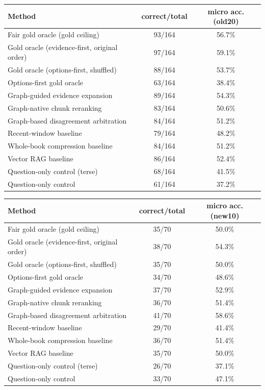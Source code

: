 \begin{tabular}{lcc}
\toprule
Method & correct/total & micro acc. (old20) \\
\midrule
Fair gold oracle (gold ceiling) & 93/164 & 56.7\% \\
Gold oracle (evidence-first, original order) & 97/164 & 59.1\% \\
Gold oracle (options-first, shuffled) & 88/164 & 53.7\% \\
Options-first gold oracle & 63/164 & 38.4\% \\
Graph-guided evidence expansion & 89/164 & 54.3\% \\
Graph-native chunk reranking & 83/164 & 50.6\% \\
Graph-based disagreement arbitration & 84/164 & 51.2\% \\
Recent-window baseline & 79/164 & 48.2\% \\
Whole-book compression baseline & 84/164 & 51.2\% \\
Vector RAG baseline & 86/164 & 52.4\% \\
Question-only control (terse) & 68/164 & 41.5\% \\
Question-only control & 61/164 & 37.2\% \\
\bottomrule
\end{tabular}

\begin{tabular}{lcc}
\toprule
Method & correct/total & micro acc. (new10) \\
\midrule
Fair gold oracle (gold ceiling) & 35/70 & 50.0\% \\
Gold oracle (evidence-first, original order) & 38/70 & 54.3\% \\
Gold oracle (options-first, shuffled) & 35/70 & 50.0\% \\
Options-first gold oracle & 34/70 & 48.6\% \\
Graph-guided evidence expansion & 37/70 & 52.9\% \\
Graph-native chunk reranking & 36/70 & 51.4\% \\
Graph-based disagreement arbitration & 41/70 & 58.6\% \\
Recent-window baseline & 29/70 & 41.4\% \\
Whole-book compression baseline & 36/70 & 51.4\% \\
Vector RAG baseline & 35/70 & 50.0\% \\
Question-only control (terse) & 26/70 & 37.1\% \\
Question-only control & 33/70 & 47.1\% \\
\bottomrule
\end{tabular}

